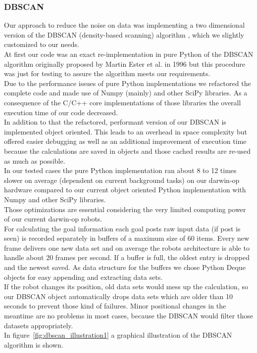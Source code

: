 \documentclass[lnicst,a4paper]{svmultln}
\begin{document}
\subsubsection{DBSCAN}
Our approach to reduce the noise on data was implementing a two dimensional version of the DBSCAN (density-based scanning) algorithm \cite{ester:kriegel}, which we slightly customized to our needs.
\\
At first our code was an exact re-implementation in pure Python of the DBSCAN algorithm \cite{ester:kriegel}
originally proposed by Martin Ester et al. in 1996 but this procedure was just for testing to assure the algorithm meets our requirements.
\\
Due to the performance issues of pure Python implementations we refactored the complete code and made use of Numpy (mainly) and other SciPy libraries. As a consequence of the C/C++ core implementations of those libraries the overall execution time of our code decreased.
\\
In addition to that the refactored, performant version of our DBSCAN is implemented object oriented. This leads to an overhead in space complexity but offered easier debugging as well as an additional improvement of execution time because the calculations are saved in objects and those cached results are re-used as much as possible.
\\
In our tested cases the pure Python implementation ran about 8 to 12 times slower on average (dependent on current background tasks) on our darwin-op hardware compared to our current object oriented Python implementation with Numpy and other SciPy libraries.
\\
Those optimizations are essential considering the very limited computing power of our current darwin-op robots.
\\
For calculating the goal information each goal posts raw input data (if post is seen) is recorded separately in buffers of a maximum size of 60 items. Every new frame delivers one new data set and on average the robots architecture is able to handle about 20 frames per second. If a buffer is full, the oldest entry is dropped and the newest saved. As data structure for the buffers we chose Python Deque objects for easy appending and extracting data sets.
\\
If the robot changes its position, old data sets would mess up the calculation, so our DBSCAN object automatically drops data sets which are older than 10 seconds to prevent those kind of failures. Minor positional changes in the meantime are no problems in most cases, because the DBSCAN would filter those datasets appropriately.
\\
In figure~\ref{fig:dbscan_illustration1} a graphical illustration of the DBSCAN algorithm is shown.
\end{document}
